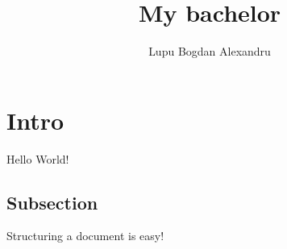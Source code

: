 \documentclass{article}
\title{My bachelor}
\date{}
\author{Lupu Bogdan Alexandru}
\begin{document}
\maketitle
\newpage
{}

\tableofcontents
\newpage

\section{Intro}
Hello World!
\subsection{Subsection}
Structuring a document is easy!

\end{document}
